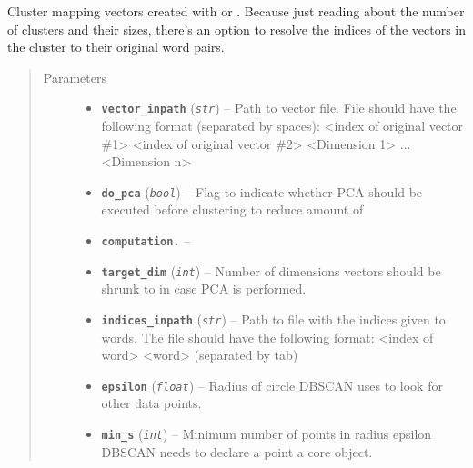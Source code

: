 \documentclass[letterpaper,10pt,english]{sphinxmanual}
\begin{document}
\begin{fulllineitems}
\label{src.clustering:src.clustering.cluster_mappings.cluster_mappings}
Cluster mapping vectors created with {\hyperref[src.mapping:module\string-src.mapping.mapthreading]{}} or .
Because just reading about the number of clusters and their sizes, there's an option to resolve the indices of
the vectors in the cluster to their original word pairs.
\begin{quote}\begin{description}
\item[{Parameters}] \leavevmode\begin{itemize}
\item {} 
\textbf{\texttt{vector\_inpath}} (\emph{\texttt{str}}) -- Path to vector file. File should have the following format (separated by spaces):
\textless{}index of original vector \#1\textgreater{} \textless{}index of original vector \#2\textgreater{} \textless{}Dimension 1\textgreater{} ... \textless{}Dimension n\textgreater{}

\item {} 
\textbf{\texttt{do\_pca}} (\emph{\texttt{bool}}) -- Flag to indicate whether PCA should be executed before clustering to reduce amount of

\item {} 
\textbf{\texttt{computation.}} -- 

\item {} 
\textbf{\texttt{target\_dim}} (\emph{\texttt{int}}) -- Number of dimensions vectors should be shrunk to in case PCA is performed.

\item {} 
\textbf{\texttt{indices\_inpath}} (\emph{\texttt{str}}) -- Path to file with the indices given to words. The file should have the following format:
\textless{}index of word\textgreater{} \textless{}word\textgreater{} (separated by tab)

\item {} 
\textbf{\texttt{epsilon}} (\emph{\texttt{float}}) -- Radius of circle DBSCAN uses to look for other data points.

\item {} 
\textbf{\texttt{min\_s}} (\emph{\texttt{int}}) -- Minimum number of points in radius epsilon DBSCAN needs to declare a point a core object.

\end{itemize}

\end{description}\end{quote}

\end{fulllineitems}
\end{document}
